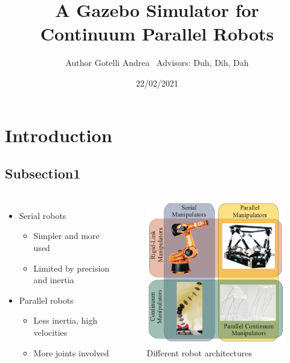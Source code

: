 \documentclass[compress]{thesisbeamer}
\title{A Gazebo Simulator for Continuum Parallel Robots}
\author[Gotelli Andrea]{Author Gotelli Andrea\newline ~ \newline \normalsize{Advisors: Duh, Dih, Dah}}
\date{22/02/2021}
\begin{document}
\MakeTitleNoFoot

    
   	\section{Introduction}
        \subsection{Subsection1}
        \begin{frame}
            \begin{columns}
			\begin{itemize}%
  				\item Serial robots
  				\begin{itemize}%
   					\item Simpler and more used
   					\item Limited by precision and inertia
  				\end{itemize}\vfill
  				\item Parallel robots
  				\begin{itemize}%
   					\item Less inertia, high velocities
   					\item More joints involved
  				\end{itemize}\vfill
 			\end{itemize}
			\vspace{2cm}
			\begin{figure}[h]
				\centering
				\includegraphics[width=\textwidth]{images/serial_parall_robots}
				\caption{Different robot architectures}
			\end{figure}
			\end{columns}
		\end{frame}
\end{document}
